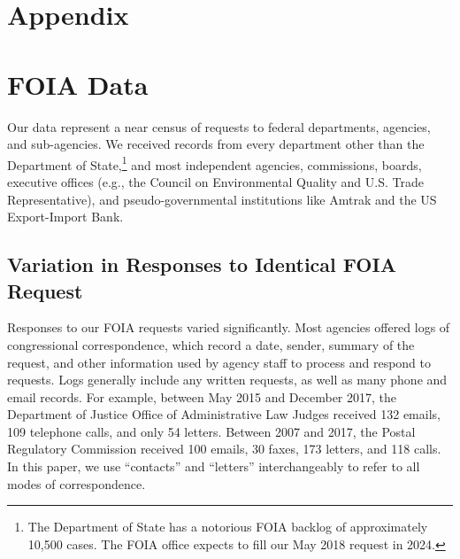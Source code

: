 \singlespacing

\clearpage

\appendix

\setcounter{table}{0}
\renewcommand{\thetable}{A\arabic{table}}

\section*{Appendix}

\DoToC

\section{FOIA Data}

Our data represent a near census of requests to federal departments, agencies, and sub-agencies. We received records from every department other than the Department of State,\footnote{The Department of State has a notorious FOIA backlog of approximately 10,500 cases. The FOIA office expects to fill our May 2018 request in 2024.} 
and most independent agencies, commissions, boards, executive offices (e.g., the Council on Environmental Quality and U.S. Trade Representative), and pseudo-governmental institutions like Amtrak and the US Export-Import Bank. 

\subsection{Variation in Responses to Identical FOIA Request} Responses to our FOIA requests varied significantly. Most agencies offered logs of congressional correspondence, which record a date, sender, summary of the request, and other information used by agency staff to process and respond to requests. Logs generally include any written requests, as well as many phone and email records. For example, between May 2015 and December 2017, the Department of Justice Office of Administrative Law Judges received 132 emails, 109 telephone calls, and only 54 letters. Between 2007 and 2017, the Postal Regulatory Commission received 100 emails, 30 faxes, 173 letters, and 118 calls. In this paper, we use ``contacts'' and ``letters'' interchangeably to refer to all modes of correspondence. 

